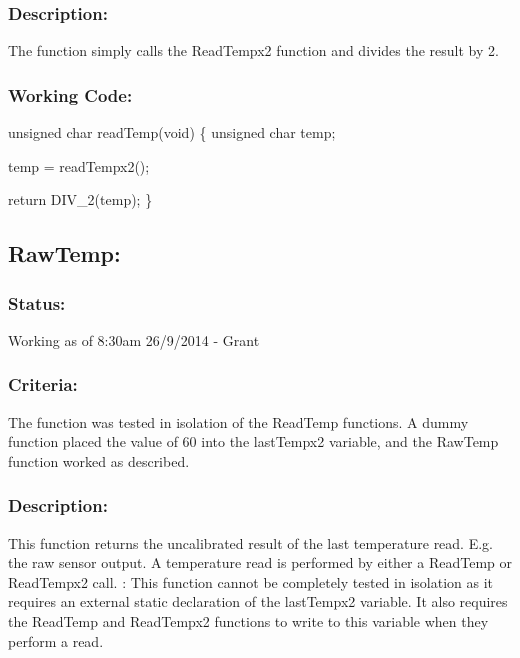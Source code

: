 \documentclass[]{article}
\begin{document}
\subsubsection{Description:}
The function simply calls the ReadTempx2 function and divides the result by 2.

\subsubsection{Working Code:}
unsigned char readTemp(void) \newline
\{ \newline
	unsigned char temp; \newline
	
	temp = readTempx2(); \newline
	
	return DIV\_2(temp); \newline
\} \newline

\subsection{RawTemp:}

\subsubsection{Status:}
Working as of 8:30am 26/9/2014 - Grant

\subsubsection{Criteria:}
The function was tested in isolation of the ReadTemp functions. A dummy function placed the value of 60 into the lastTempx2 variable, and the RawTemp function worked as described.

\subsubsection{Description:}
This function returns the uncalibrated result of the last temperature read. E.g. the raw sensor output. A temperature read is performed by either a ReadTemp or ReadTempx2 call. \newline:
This function cannot be completely tested in isolation as it requires an external static declaration of the lastTempx2 variable. It also requires the ReadTemp and ReadTempx2 functions to write to this variable when they perform a read.
\end{document}
